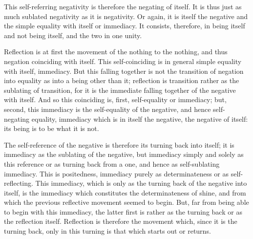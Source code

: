 This self-referring negativity is therefore the negating of itself.
It is thus just as much sublated negativity as it is negativity.
Or again, it is itself the negative
and the simple equality with itself or immediacy.
It consists, therefore, in being itself and not being itself,
and the two in one unity.

Reflection is at first the movement of
the nothing to the nothing,
and thus negation coinciding with itself.
This self-coinciding is in general
simple equality with itself, immediacy.
But this falling together is not
the transition of negation into equality
as into a being other than it;
reflection is transition rather as the sublating of transition,
for it is the immediate falling together of the negative with itself.
And so this coinciding is, first, self-equality or immediacy;
but, second, this immediacy is the self-equality of the negative,
and hence self-negating equality,
immediacy which is in itself the negative, the negative of itself:
its being is to be what it is not.

The self-reference of the negative is
therefore its turning back into itself;
it is immediacy as the sublating of the negative,
but immediacy simply and solely as this reference
or as turning back from a one,
and hence as self-sublating immediacy.
This is positedness,
immediacy purely as determinateness
or as self-reflecting.
This immediacy, which is only as
the turning back of the negative into itself,
is the immediacy which constitutes the determinateness of shine,
and from which the previous reflective movement seemed to begin.
But, far from being able to begin with this immediacy,
the latter first is rather as the turning back
or as the reflection itself.
Reflection is therefore the movement which,
since it is the turning back,
only in this turning is that
which starts out or returns.

